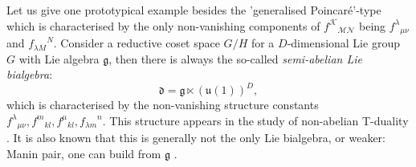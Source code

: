 \documentclass[11pt,a4paper]{article}
\numberwithin{equation}{section}
\begin{document}
Let us give one prototypical example besides the 'generalised Poincar\'e'-type which is characterised by the only non-vanishing components of ${f^{\mathcal{K}}}_{\mathcal{M}\mathcal{N}}$ being ${f^\lambda}_{\mu\nu}$ and ${f_{\lambda M}}^N$. Consider a reductive coset space $G/H$ for a $D$-dimensional Lie group $G$ with Lie algebra $\mathfrak{g}$, then there is always the so-called \textit{semi-abelian Lie bialgebra}:
\begin{equation}
\mathfrak{d} = \mathfrak{g} \ltimes (\mathfrak{u}(1))^D \nonumber ,
\end{equation}
which is characterised by the non-vanishing structure constants ${f^\lambda}_{\mu\nu}, {f^m}_{kl}, {f^\mu}_{kl}, {f_{\lambda m}}^n$. This structure appears in the study of non-abelian T-duality \cite{Klimcik:1995ux}. It is also known that this is generally not the only Lie bialgebra, or weaker: Manin pair, one can build from $\mathfrak{g}$ \cite{Vicedo:2015pna}.

%
\end{document}
